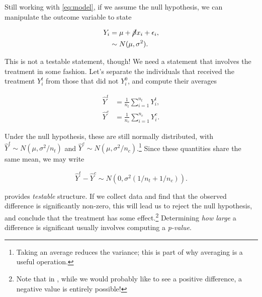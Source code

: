 \documentclass{tufte-handout}
\begin{document}
Still working with \eqref{eq:model}, if we assume the null hypothesis,
we can manipulate the outcome variable to state

\begin{equation}\begin{aligned}
  Y_i &= \mu + \cancel{\beta}x_i + \epsilon_i, \\
      &\sim N(\mu,\sigma^2).
\end{aligned}\end{equation}

This is not a testable statement, though! We need a statement that involves the
treatment in some fashion. Let's separate the individuals that received the
treatment \(Y_i^t\) from those that did not \(Y_i^0\), and compute their averages

\begin{equation}\begin{aligned}
  \hat{Y}^t &= \frac{1}{n_t}\sum_{i=1}^{n_t} Y_i^t, \\
  \hat{Y}^c &= \frac{1}{n_c}\sum_{i=1}^{n_c} Y_i^c.
\end{aligned}\end{equation}

Under the null hypothesis, these are still normally distributed, with
\(\hat{Y}^t\sim N(\mu,\sigma^2/n_t)\) and \(\hat{Y}^c\sim
N(\mu,\sigma^2/n_c)\).\footnote{Taking an average reduces the variance; this is part
of why averaging is a useful operation.} Since these quantities share the same
mean, we may write

\begin{equation}\label{eq:contrast}
  \hat{Y}^t-\hat{Y}^c \sim N(0,\sigma^2(1/n_t+1/n_c)).
\end{equation}

 provides \emph{testable} structure. If we collect data and find
that the observed difference is significantly non-zero, this will lead us to
reject the null hypothesis, and conclude that the treatment has some
effect.\footnote{Note that in , while we would probably like to see
a positive difference, a negative value is entirely possible!} Determining \emph{how
large} a difference is significant usually involves computing a \emph{p-value}.
\end{document}
